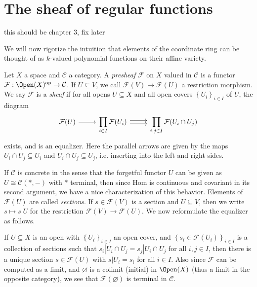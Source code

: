 \chapter{The sheaf of regular functions}

this should be chapter 3, fix later

We will now rigorize the intuition that elements of the coordinate ring can be thought of as $k$-valued polynomial functions on their affine variety.

\begin{definition}\label{dfn:presheaf}
	Let $X$ a space and $\mathcal{C} $ a category. A \emph{presheaf} $\mathcal{F} $ on $X$ valued in $\mathcal{C} $ is a functor $\mathcal{F} : \Open(X) ^{\mathrm{op}}  \to \mathcal{C} $. If $U\subseteq V$, we call $\mathcal{F} (V)\to \mathcal{F} (U)$ a restriction morphism. We say $\mathcal{F} $ is a \emph{sheaf} if for all opens $U\subseteq X$ and all open covers $\left\{ U_i \right\} _{i\in I} $ of $U$, the diagram
	\[
		\begin{tikzcd}[row sep = 2.5em, column sep = 2.5em]
			\mathcal{F} (U) \ar[r]  & \displaystyle{\prod_{i\in I} \mathcal{F} (U_i)}\ar[shift left, r] \ar[shift right, r]  & \displaystyle{\prod_{i,j\in I} \mathcal{F} (U_i \cap U_j)}
	\end{tikzcd}
	\]
	exists, and is an equalizer. Here the parallel arrows are given by the maps $U_i \cap U_j \subseteq U_i$ and $U_i \cap U_j \subseteq U_j$, i.e. inserting into the left and right sides.
\end{definition}

If $\mathcal{C} $ is concrete in the sense that the forgetful functor $U$ can be given as $U \cong \mathcal{C} (*,-)$ with $*$ terminal, then since Hom is continuous and covariant in its second argument, we have a nice characterization of this behavior. Elements of $\mathcal{F} (U)$ are called \emph{sections}. If $s\in \mathcal{F} (V)$ is a section and $U\subseteq V$, then we write $s\mapsto s|U$ for the restriction $\mathcal{F} (V)\to \mathcal{F} (U)$. We now reformulate the equalizer as follows.

If $U\subseteq X$ is an open with $\left\{ U_i \right\} _{i\in I} $ an open cover, and $\left\{ s_i\in \mathcal{F} (U_i) \right\}_{i\in I} $ is a collection of sections such that $s_i|U_i \cap U_j = s_j|U_i \cap U_j$ for all $i,j\in I$, then there is a unique section $s\in \mathcal{F} (U)$ with $s|U_i = s_i$ for all $i\in I$. Also since $\mathcal{F} $ can be computed as a limit, and $\varnothing $ is a colimit (initial) in $\Open(X) $ (thus a limit in the opposite category), we see that $\mathcal{F} (\varnothing )$ is terminal in $\mathcal{C} $.

